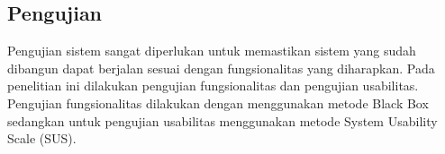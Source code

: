 \subsection{Pengujian}
Pengujian sistem sangat diperlukan untuk memastikan sistem yang sudah dibangun dapat berjalan sesuai dengan fungsionalitas yang diharapkan. Pada penelitian ini dilakukan pengujian fungsionalitas dan pengujian usabilitas. Pengujian fungsionalitas dilakukan dengan menggunakan metode Black Box sedangkan untuk pengujian usabilitas menggunakan metode System Usability Scale (SUS).


